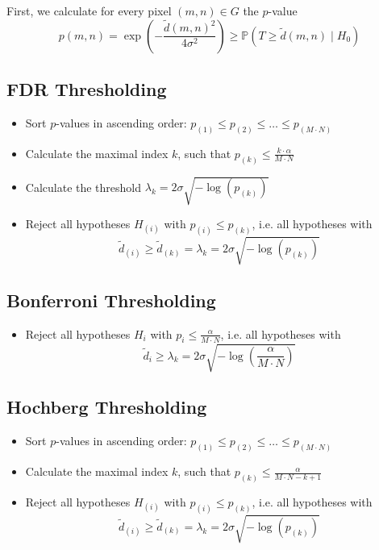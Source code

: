 \documentclass{beamer}
\begin{document}
\begin{frame}
	First, we calculate for every pixel $(m, n) \in G$ the $p$-value
	\begin{equation}
		p(m, n) = \exp \left( - \frac{\tilde{d}(m, n)^2}{4 \sigma^2} \right) \geq \mathbb{P}(T \geq \tilde{d}(m, n) \mid H_0)
	\end{equation}
\end{frame}

\begin{frame}
	\subsection{FDR Thresholding}
	
	\begin{itemize}
		\item Sort $p$-values in ascending order: $p_{(1)} \leq p_{(2)} \leq \dots \leq p_{(M \cdot N)}$
		\item Calculate the maximal index $k$, such that $p_{(k)} \leq \frac{k \cdot \alpha}{M \cdot N}$
		\item Calculate the threshold $\lambda_{k} = 2 \sigma \sqrt{- \log(p_{(k)})}$
		\item Reject all hypotheses $H_{(i)}$ with $p_{(i)} \leq p_{(k)}$, i.e. all hypotheses with $$\tilde{d}_{(i)} \geq \tilde{d}_{(k)} = \lambda_{k} = 2 \sigma \sqrt{- \log(p_{(k)})}$$
	\end{itemize}
\end{frame}

\begin{frame}
	\subsection{Bonferroni Thresholding}
	
	\begin{itemize}
		\item Reject all hypotheses $H_{i}$ with $p_{i} \leq \frac{\alpha}{M \cdot N}$, i.e. all hypotheses with $$\tilde{d}_{i} \geq \lambda_k = 2 \sigma \sqrt{- \log \left( \frac{\alpha}{M \cdot N} \right)}$$
	\end{itemize}
\end{frame}

\begin{frame}
	\subsection{Hochberg Thresholding}
	
	\begin{itemize}
		\item Sort $p$-values in ascending order: $p_{(1)} \leq p_{(2)} \leq \dots \leq p_{(M \cdot N)}$
		\item Calculate the maximal index $k$, such that $p_{(k)} \leq \frac{\alpha}{M \cdot N - k + 1}$
		\item Reject all hypotheses $H_{(i)}$ with $p_{(i)} \leq p_{(k)}$, i.e. all hypotheses with $$\tilde{d}_{(i)} \geq \tilde{d}_{(k)} = \lambda_{k} = 2 \sigma \sqrt{- \log(p_{(k)})}$$
	\end{itemize}
\end{frame}
\end{document}

